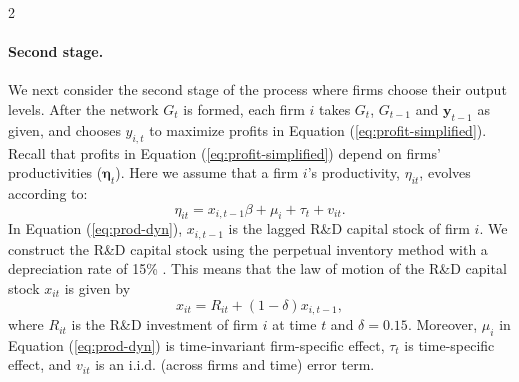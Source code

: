 \documentclass[12pt]{article}
\begin{document}
\begin{spacing}{2}
\paragraph{Second stage.} We next consider the second stage of the process where firms choose their output levels. After the network $G_{t}$ is formed, each firm $i$ takes $G_{t}$, $G_{t-1}$ and $\mathbf{y}_{t-1}$ as given, and chooses $y_{i,t}$ to maximize profits in Equation (\ref{eq:profit-simplified}). Recall that profits in Equation (\ref{eq:profit-simplified}) depend on firms' productivities ($\bm{\eta}_t$). Here we assume that a firm $i$'s productivity, $\eta_{it}$, evolves according to:%
\begin{equation}
\eta_{it} = 
x_{i,t-1} \beta
+
\mu_i
+
\tau_t
+
v_{it}.
\label{eq:prod-dyn}
\end{equation}
In Equation (\ref{eq:prod-dyn}),  
$x_{i,t-1}$ is the lagged R\&D capital stock of firm $i$. We construct the R\&D capital stock using the perpetual inventory method with a depreciation rate of 15\% \citep[cf.][]{Hall2000,Hall2010,Bloom2013}. This means that the law of motion of the R\&D capital stock $x_{it}$ is given by 
\begin{equation}
x_{it} = R_{it} + (1-\delta) x_{i,t-1},
\label{eq:rnd-accumulation}
\end{equation}
where $R_{it}$ is the R\&D investment of firm $i$ at time $t$ and $\delta = 0.15$. Moreover, $\mu_i$ in Equation (\ref{eq:prod-dyn}) is time-invariant firm-specific effect, $\tau_t$ is time-specific effect, and $v_{it}$ is an i.i.d. (across firms and time) error term.


\end{spacing}
\end{document}
